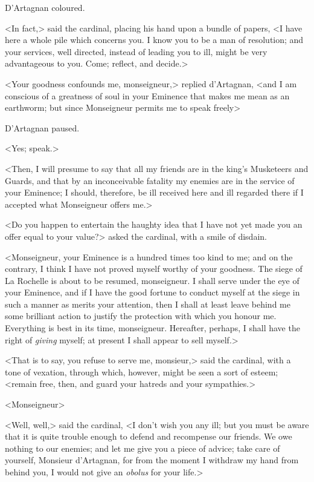 D'Artagnan coloured. 

<In fact,> said the cardinal, placing his hand upon a bundle of papers, <I have here a whole pile which concerns you. I know you to be a man of resolution; and your services, well directed, instead of leading you to ill, might be very advantageous to you. Come; reflect, and decide.> 

<Your goodness confounds me, monseigneur,> replied d'Artagnan, <and I am conscious of a greatness of soul in your Eminence that makes me mean as an earthworm; but since Monseigneur permits me to speak freely\longdash> 

D'Artagnan paused. 

<Yes; speak.> 

<Then, I will presume to say that all my friends are in the king's Musketeers and Guards, and that by an inconceivable fatality my enemies are in the service of your Eminence; I should, therefore, be ill received here and ill regarded there if I accepted what Monseigneur offers me.> 

<Do you happen to entertain the haughty idea that I have not yet made you an offer equal to your value?> asked the cardinal, with a smile of disdain. 

<Monseigneur, your Eminence is a hundred times too kind to me; and on the contrary, I think I have not proved myself worthy of your goodness. The siege of La Rochelle is about to be resumed, monseigneur. I shall serve under the eye of your Eminence, and if I have the good fortune to conduct myself at the siege in such a manner as merits your attention, then I shall at least leave behind me some brilliant action to justify the protection with which you honour me. Everything is best in its time, monseigneur. Hereafter, perhaps, I shall have the right of \textit{giving} myself; at present I shall appear to sell myself.> 

<That is to say, you refuse to serve me, monsieur,> said the cardinal, with a tone of vexation, through which, however, might be seen a sort of esteem; <remain free, then, and guard your hatreds and your sympathies.> 

<Monseigneur\longdash> 

<Well, well,> said the cardinal, <I don't wish you any ill; but you must be aware that it is quite trouble enough to defend and recompense our friends. We owe nothing to our enemies; and let me give you a piece of advice; take care of yourself, Monsieur d'Artagnan, for from the moment I withdraw my hand from behind you, I would not give an \textit{obolus} for your life.> 

